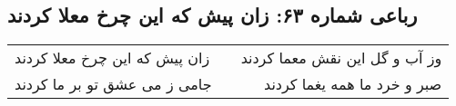 \begin{center}
\section*{رباعی شماره ۶۳: زان پیش که این چرخ معلا کردند}
\label{sec:063}
\begin{longtable}{l p{0.5cm} r}
زان پیش که این چرخ معلا کردند
&&
وز آب و گل این نقش معما کردند
\\
جامی ز می عشق تو بر ما کردند
&&
صبر و خرد ما همه یغما کردند
\\
\end{longtable}
\end{center}

